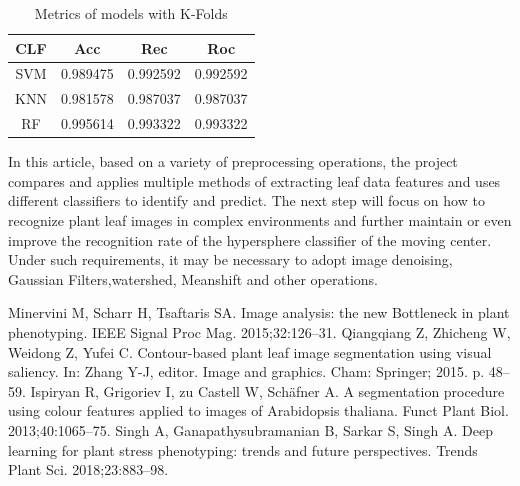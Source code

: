 \documentclass[conference]{IEEEtran}
\begin{document}
\begin{table}[htbp]
\caption{Metrics of models with K-Folds}
\begin{center}
\begin{tabular}{|c|c|c|c|}



\hline
CLF &Acc&Rec &Roc\\
\hline
SVM&0.989475 &0.992592   &0.992592 \\
\hline
KNN&0.981578 &0.987037   &0.987037 \\
\hline
RF&0.995614 &0.993322   &0.993322 \\
\hline

\end{tabular}
\label{tab3}
\end{center}
\end{table}

In this article, based on a variety of preprocessing operations, the project compares and applies multiple methods of extracting leaf data features and uses different classifiers to identify and predict. The next step will focus on how to recognize plant leaf images in complex environments and further maintain or even improve the recognition rate of the hypersphere classifier of the moving center. Under such requirements, it may be necessary to adopt image denoising, Gaussian Filters,watershed, Meanshift and other operations.


\begin{thebibliography}{00}
 Minervini M, Scharr H, Tsaftaris SA. Image analysis: the new Bottleneck in
plant phenotyping. IEEE Signal Proc Mag. 2015;32:126–31.
 Qiangqiang Z, Zhicheng W, Weidong Z, Yufei C. Contour-based plant leaf
image segmentation using visual saliency. In: Zhang Y-J, editor. Image
and graphics. Cham: Springer; 2015. p. 48–59.
 Ispiryan R, Grigoriev I, zu Castell W, Schäfner A. A segmentation procedure using colour features applied to images of Arabidopsis thaliana.
Funct Plant Biol. 2013;40:1065–75.
 Singh A, Ganapathysubramanian B, Sarkar S, Singh A. Deep learning for
plant stress phenotyping: trends and future perspectives. Trends Plant
Sci. 2018;23:883–98.
\end{thebibliography}
\end{document}
